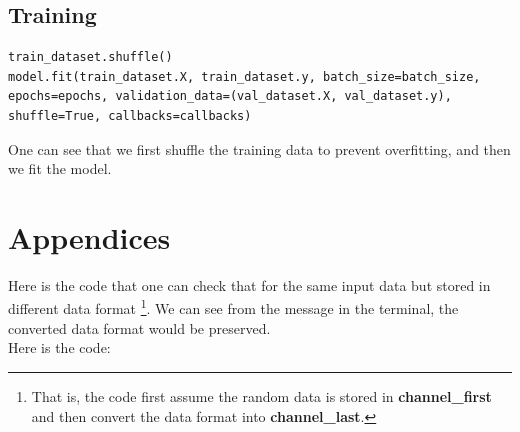 \documentclass[12pt]{report}
\numberwithin{equation}{section}
\begin{document}
\section{Training}
\begin{lstlisting}
train_dataset.shuffle()
model.fit(train_dataset.X, train_dataset.y, batch_size=batch_size, epochs=epochs, validation_data=(val_dataset.X, val_dataset.y), shuffle=True, callbacks=callbacks)
\end{lstlisting}

One can see that we first shuffle the training data to prevent overfitting, and then we fit the model.
\chapter{Appendices}\label{sec::Appendices}
Here is the code that one can check that for the same input data but stored in different data format
\footnote{That is, the code first assume the random data is stored in \textbf{channel\_first} and then convert the data format into \textbf{channel\_last}.}. 
We can see from the message in the terminal, the converted data format would be preserved.
\\\indent Here is the code:
\end{document}
